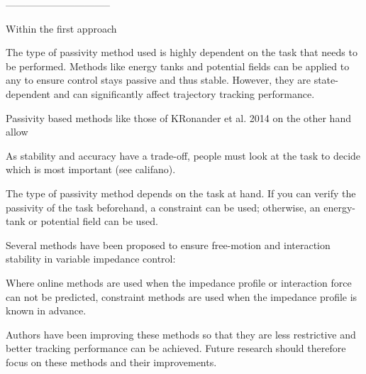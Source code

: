 





--------------------------------

Within the first approach 

The type of passivity method used is highly dependent on the task that needs to be performed. Methods like energy tanks and potential fields can be applied to any to ensure control stays passive and thus stable. However, they are state-dependent and can significantly affect trajectory tracking performance. 

Passivity based methods like those of KRonander et al. 2014 on the other hand allow 

As stability and accuracy have a trade-off, people must look at the task to decide which is most important (see califano).

The type of passivity method depends on the task at hand. If you can verify the passivity of the task beforehand, a constraint can be used; otherwise, an energy-tank or potential field can be used.

Several methods have been proposed to ensure free-motion and interaction stability in variable impedance control:

Where online methods are used when the impedance profile or interaction force can not be predicted, constraint methods are used when the impedance profile is known in advance.

Authors have been improving these methods so that they are less restrictive and better tracking performance can be achieved. Future research should therefore focus on these methods and their improvements. 

